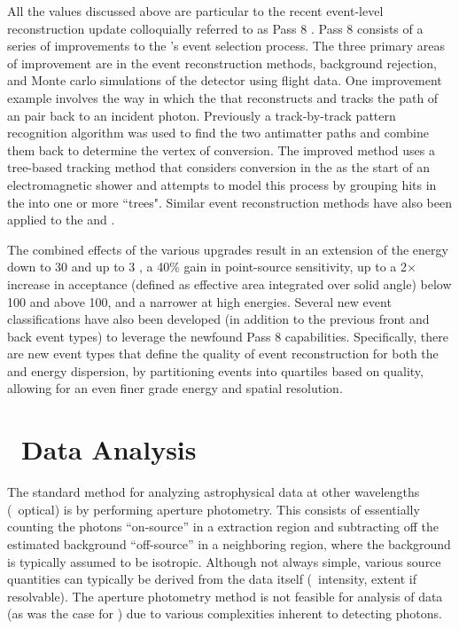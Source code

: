 All the values discussed above are particular to the recent \lat{} event-level reconstruction update colloquially referred to as Pass 8 \citep{atwood13}. Pass 8 consists of a series of improvements to the \lat{}'s event selection process. The three primary areas of improvement are in the event reconstruction methods, background rejection, and Monte carlo simulations of the detector using flight data. One improvement example involves the way in which the that \lat{} reconstructs and tracks the path of an \ee{} pair back to an incident photon. Previously a track-by-track pattern recognition algorithm was used to find the two antimatter paths and combine them back to determine the vertex of conversion. The improved method uses a tree-based tracking method that considers conversion in the \tkr{} as the start of an electromagnetic shower and attempts to model this process by grouping hits in the \tkr{} into one or more ``trees". Similar event reconstruction methods have also been applied to the \acd{} and \calo{}. 

The combined effects of the various upgrades result in an extension of the energy down to 30\mev{} and up to 3\tev{} \cite[see Chapter \ref{chap:2FHL} for applications]{Bruel12}, a 40\% gain in point-source sensitivity, up to a 2$\times$ increase in acceptance (defined as effective area integrated over solid angle) below 100\mev{} and above 100\gev{}, and a narrower \psf{} at high energies. Several new event classifications have also been developed (in addition to the previous front and back event types) to leverage the newfound  Pass 8 \lat{} capabilities. Specifically, there are new event types that define the quality of event reconstruction for both the \psf{} and energy dispersion, by partitioning events into quartiles based on quality, allowing for an even finer grade energy and spatial resolution.




\section{\label{FGST:analysis}\gam~Data Analysis}
The standard method for analyzing astrophysical data at other wavelengths (\eg{}\ optical) is by performing aperture photometry. This consists of essentially counting the photons ``on-source'' in a extraction region and subtracting off the estimated background ``off-source'' in a neighboring region, where the background is typically assumed to be isotropic. Although not always simple, various source quantities can typically be derived from the data itself (\eg{}\ intensity, extent if resolvable). The aperture photometry method is not feasible for analysis of \Fermi{} data (as was the case for \egret{} \cite{mattox96}) due to various complexities inherent to detecting \gam{} photons. 

